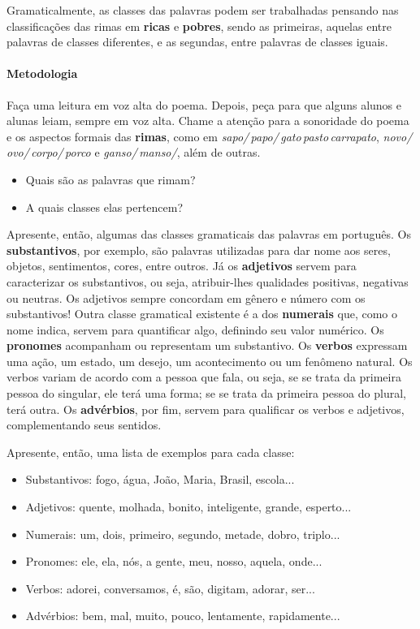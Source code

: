 \documentclass[11pt]{extarticle}
\begin{document}
Gramaticalmente, as classes das palavras podem ser trabalhadas
pensando nas classificações das rimas em \textbf{ricas} e \textbf{pobres},
sendo as primeiras, aquelas entre palavras de classes diferentes,
e as segundas, entre palavras de classes iguais. 

\paragraph{Metodologia} Faça uma leitura em voz alta do poema.
Depois, peça para que alguns alunos e alunas leiam, 
sempre em voz alta.
Chame a atenção para a sonoridade do poema e os aspectos formais
das \textbf{rimas}, como em \textit{sapo/\,papo/\,gato\,pasto\,carrapato}, \textit{novo/\,ovo/\,corpo/\,porco} e
\textit{ganso/\,manso/}, além de outras.

\begin{itemize}
\item Quais são as palavras que rimam? 
\item A quais classes elas pertencem?
\end{itemize}

Apresente, então, algumas das classes gramaticais das 
palavras em português.
Os \textbf{substantivos}, por exemplo, são palavras utilizadas
para dar nome aos seres, objetos, sentimentos, cores, entre outros.
Já os \textbf{adjetivos} servem para caracterizar os substantivos,
ou seja, atribuir-lhes qualidades positivas, negativas ou neutras. 
Os adjetivos sempre concordam em gênero e número com os substantivos!
Outra classe gramatical existente é a dos \textbf{numerais} que, como
o nome indica, servem para quantificar algo, definindo seu valor numérico. 
Os \textbf{pronomes} acompanham ou representam um substantivo.
Os \textbf{verbos} expressam uma ação, um estado, um desejo,
um acontecimento ou um fenômeno natural. Os verbos variam de acordo
com a pessoa que fala, ou seja, se se trata da primeira pessoa
do singular, ele terá uma forma; se se trata da primeira pessoa do
plural, terá outra. 
Os \textbf{advérbios}, por fim, servem para qualificar os verbos e adjetivos,
complementando seus sentidos.

Apresente, então, uma lista de exemplos para cada classe:

\begin{itemize}
	\item Substantivos: fogo, água, João, Maria, Brasil, escola...
	\item Adjetivos: quente, molhada, bonito, inteligente, grande, esperto...
	\item Numerais: um, dois, primeiro, segundo, metade, dobro, triplo...
	\item Pronomes: ele, ela, nós, a gente, meu, nosso, aquela, onde...
	\item Verbos: adorei, conversamos, é, são, digitam, adorar, ser...
	\item Advérbios: bem, mal, muito, pouco, lentamente, rapidamente...
\end{itemize}
\end{document}
